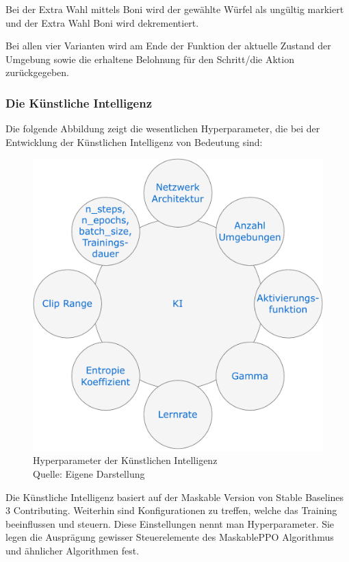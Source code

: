 Bei der Extra Wahl mittels Boni wird der gewählte Würfel als ungültig markiert und der Extra Wahl Boni wird dekrementiert.

Bei allen vier Varianten wird am Ende der Funktion der aktuelle Zustand der Umgebung sowie die erhaltene Belohnung für den Schritt/die Aktion zurückgegeben.

\subsubsection{Die Künstliche Intelligenz}
Die folgende Abbildung zeigt die wesentlichen Hyperparameter, die bei der Entwicklung der Künstlichen Intelligenz von Bedeutung sind:
\nopagebreak
\begin{figure}[H]
	\includegraphics[width=1\textwidth]{Bilder/KI} 
	\caption[Hyperparameter der Künstlichen Intelligenz]{Hyperparameter der Künstlichen Intelligenz\\ Quelle: Eigene Darstellung}
\end{figure}

Die Künstliche Intelligenz basiert auf der Maskable Version von Stable Baselines 3 Contributing. Weiterhin sind Konfigurationen zu treffen, welche das Training beeinflussen und steuern. Diese Einstellungen nennt man Hyperparameter. Sie legen die Ausprägung gewisser Steuerelemente des MaskablePPO Algorithmus und ähnlicher Algorithmen fest.


